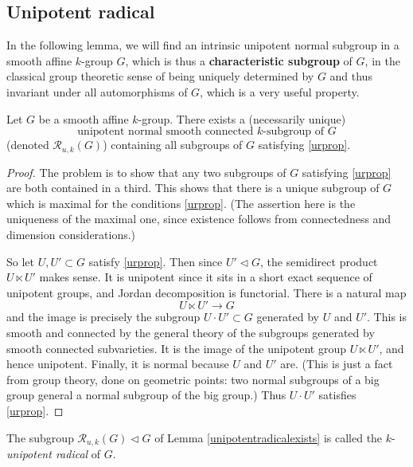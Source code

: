 \documentclass[10pt]{article}
\renewcommand{\(}{\left(}
\renewcommand{\)}{\right)}
\numberwithin{thm}{subsection}
\begin{document}
\subsection{Unipotent radical}
In the following lemma, we will find an intrinsic unipotent normal subgroup in a smooth affine $k$-group $G$, which is thus a \textbf{characteristic subgroup} of $G$,
in the classical group theoretic sense of being uniquely determined
by $G$ and thus invariant under all automorphisms of $G$, which is a very useful property.

\begin{lem}\label{unipotentradicalexists}
Let $G$ be a smooth affine $k$-group.
There exists a (necessarily unique)
\begin{equation*}\label{urprop}\tag{$\star$}
\text{unipotent normal smooth connected $k$-subgroup of $G$}
\end{equation*}
(denoted $\mathscr{R}_{u,k}(G)$)
 containing all subgroups of $G$ satisfying \eqref{urprop}.
\end{lem}
\begin{proof} 
The problem is to show that any two subgroups of $G$
satisfying \eqref{urprop}
are both contained in a third.
This shows that there is a unique subgroup of $G$
which is maximal for the conditions \eqref{urprop}.
(The assertion here is the uniqueness of the maximal one,
since existence follows from connectedness and dimension considerations.)

So let $U,U'\subset G$ satisfy \eqref{urprop}.
Then since $U'\vartriangleleft G$,
the semidirect product
$U\ltimes U'$ makes sense.
It is unipotent since it sits in a short exact sequence of unipotent groups,
and Jordan decomposition is functorial.
There is a natural map
\[U\ltimes U'\rightarrow G\]
and the image is precisely the subgroup $U\cdot U'\subset G$ generated
by $U$ and $U'$.
This is smooth and connected by the general theory of the subgroups
generated by smooth connected subvarieties.
It is the image of the unipotent group
$U\ltimes U'$, and hence unipotent.
Finally, it is normal because $U$ and $U'$ are.
(This is just a fact from group theory, done on geometric points:
two normal subgroups of a big group
general a normal subgroup of the big group.)  
Thus $U\cdot U'$ satisfies \eqref{urprop}.
\end{proof}
\begin{defn}\label{}
The subgroup $\mathscr{R}_{u,k}(G)\vartriangleleft G$
of Lemma \ref{unipotentradicalexists}
is called the $k$-\textit{unipotent radical} of $G$.
\end{defn}
\end{document}
